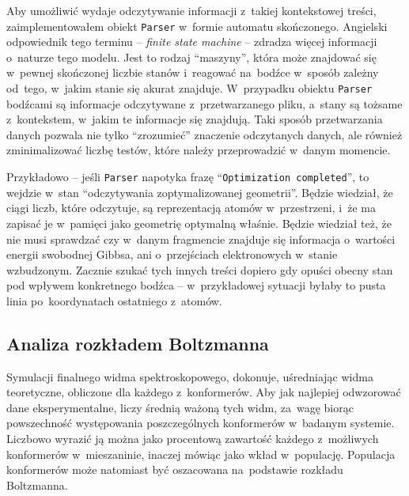 Aby umożliwić wydaje odczytywanie informacji z~takiej kontekstowej treści, zaimplementowałem
  obiekt \texttt{Parser} w~formie automatu skończonego.
Angielski odpowiednik tego terminu \--- \textit{finite state machine} \--- zdradza więcej
  informacji o~naturze tego modelu.
Jest to rodzaj \enquote{maszyny}, która może znajdować się w~pewnej skończonej liczbie stanów
  i~reagować na~bodźce w~sposób zależny od~tego, w~jakim stanie się akurat znajduje.
W~przypadku obiektu \texttt{Parser} bodźcami są informacje odczytywane z~przetwarzanego pliku,
  a~stany są tożsame z~kontekstem, w~jakim te informacje się znajdują.
Taki sposób przetwarzania danych pozwala nie tylko \enquote{zrozumieć} znaczenie odczytanych
  danych, ale również zminimalizować liczbę testów, które należy przeprowadzić w~danym momencie.

Przykładowo \--- jeśli \texttt{Parser} napotyka frazę \enquote{\texttt{Optimization completed}},
  to wejdzie w~stan \enquote{odczytywania zoptymalizowanej geometrii}.
Będzie wiedział, że ciągi liczb, które odczytuje, są reprezentacją atomów w~przestrzeni,
  i~że ma zapisać je w~pamięci jako geometrię optymalną właśnie.
Będzie wiedział też, że nie musi sprawdzać czy w~danym fragmencie znajduje się informacja
  o~wartości energii swobodnej Gibbsa, ani o~przejściach elektronowych w~stanie wzbudzonym.
Zacznie szukać tych innych treści dopiero gdy opuści obecny stan pod wpływem konkretnego bodźca
  \--- w~przykładowej sytuacji byłaby to pusta linia po~koordynatach ostatniego z~atomów.

\subsection{Analiza rozkładem Boltzmanna}\label{implementation:boltzmann}
Symulacji finalnego widma spektroskopowego, \tesliper{} dokonuje, uśredniając widma teoretyczne,
  obliczone dla każdego z~konformerów.
Aby jak najlepiej odwzorować dane eksperymentalne, liczy średnią ważoną tych widm, za~wagę biorąc
  powszechność występowania poszczególnych konformerów w~badanym systemie.
Liczbowo wyrazić ją można jako procentową zawartość każdego z~możliwych konformerów w~mieszaninie,
  inaczej mówiąc jako wkład w~populację.
Populacja konformerów może natomiast być oszacowana na~podstawie rozkładu Boltzmanna.

